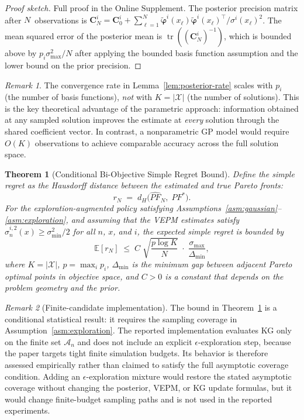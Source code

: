 \documentclass[12pt]{article}
\theoremstyle{plain}
\newtheorem{theorem}{Theorem}[section]
\theoremstyle{definition}
\theoremstyle{remark}
\newtheorem{remark}{Remark}[section]
\begin{document}
\begin{proof}[Proof sketch]
Full proof in the Online Supplement.
The posterior precision matrix after $N$~observations is
$\mathbf{C}_{N}^{i}=\mathbf{C}_{0}^{i}+\sum_{\ell=1}^{N}
\tilde{\boldsymbol{\varphi}}^{i}(x_{\ell})
\tilde{\boldsymbol{\varphi}}^{i}(x_{\ell})^{\!\top}/
\sigma^{i}(x_{\ell})^{2}$.
The mean squared error of the posterior mean is
$\operatorname{tr}((\mathbf{C}_{N}^{i})^{-1})$, which is bounded above
by $p_{i}\sigma_{\max}^{2}/N$ after applying the bounded basis function
assumption and the lower bound on the prior precision.
\end{proof}

\begin{remark}\label{rem:p-not-K}
The convergence rate in Lemma~\ref{lem:posterior-rate} scales with $p_{i}$
(the number of basis functions), \emph{not} with
$K=\lvert\mathcal{X}\rvert$ (the number of solutions).  This is the key
theoretical advantage of the parametric approach: information obtained at
any sampled solution improves the estimate at \emph{every} solution through
the shared coefficient vector.  In contrast, a nonparametric GP model
would require $O(K)$ observations to achieve comparable accuracy across
the full solution space.
\end{remark}

\begin{theorem}[Conditional Bi-Objective Simple Regret Bound]\label{thm:regret}
Define the simple regret as the Hausdorff distance between the estimated
and true Pareto fronts:
\[
  r_{N} \;=\; d_{H}\!\bigl(\widehat{PF}_{N},\; PF^{*}\bigr).
\]
For the exploration-augmented policy satisfying
Assumptions~\ref{asm:gaussian}--\ref{asm:exploration}, and
assuming that the VEPM estimates satisfy
$\hat{\sigma}_{n}^{i,2}(x)\ge\sigma_{\min}^{2}/2$ for all $n$, $x$, and
$i$, the expected simple regret is bounded by
\[
  \mathbb{E}[r_{N}]
  \;\le\;
  C\;\sqrt{\frac{p\log K}{N}}\;\cdot\;
  \frac{\sigma_{\max}}{\Delta_{\min}},
\]
where $K = |\mathcal{X}|$, $p=\max_{i}p_{i}$, $\Delta_{\min}$ is the minimum gap between
adjacent Pareto optimal points in objective space, and $C>0$ is a constant
that depends on the problem geometry and the prior.
\end{theorem}

\begin{remark}[Finite-candidate implementation]\label{rem:finite-candidate-theory}
The bound in Theorem~\ref{thm:regret} is a conditional statistical result:
it requires the sampling coverage in Assumption~\ref{asm:exploration}.
The reported implementation evaluates KG only on the finite set
$\mathcal{A}_{n}$ and does not include an explicit $\epsilon$-exploration
step, because the paper targets tight finite simulation budgets.  Its
behavior is therefore assessed empirically rather than claimed to satisfy
the full asymptotic coverage condition.  Adding an $\epsilon$-exploration
mixture would restore the stated asymptotic coverage without changing the
posterior, VEPM, or KG update formulas, but it would change finite-budget
sampling paths and is not used in the reported experiments.
\end{remark}
\end{document}
